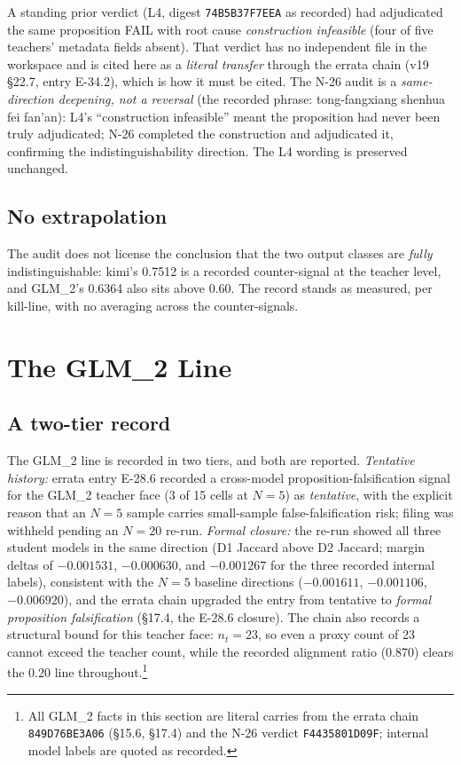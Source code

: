 \documentclass[11pt]{article}
\newcommand{\sha}[1]{\texttt{#1}}
\begin{document}
A standing prior verdict (L4, digest \sha{74B5B37F7EEA} as recorded) had adjudicated the same proposition FAIL with root cause \emph{construction infeasible} (four of five teachers' metadata fields absent). That verdict has no independent file in the workspace and is cited here as a \emph{literal transfer} through the errata chain (v19 \S22.7, entry E-34.2), which is how it must be cited. The N-26 audit is a \emph{same-direction deepening, not a reversal} (the recorded phrase: tong-fangxiang shenhua fei fan'an): L4's ``construction infeasible'' meant the proposition had never been truly adjudicated; N-26 completed the construction and adjudicated it, confirming the indistinguishability direction. The L4 wording is preserved unchanged.

\subsection{No extrapolation}

The audit does not license the conclusion that the two output classes are \emph{fully} indistinguishable: kimi's 0.7512 is a recorded counter-signal at the teacher level, and GLM\_2's 0.6364 also sits above 0.60. The record stands as measured, per kill-line, with no averaging across the counter-signals.

\section{The GLM\_2 Line}\label{sec:glm2}

\subsection{A two-tier record}

The GLM\_2 line is recorded in two tiers, and both are reported. \emph{Tentative history:} errata entry E-28.6 recorded a cross-model proposition-falsification signal for the GLM\_2 teacher face (3 of 15 cells at $N = 5$) as \emph{tentative}, with the explicit reason that an $N = 5$ sample carries small-sample false-falsification risk; filing was withheld pending an $N = 20$ re-run. \emph{Formal closure:} the re-run showed all three student models in the same direction (D1 Jaccard above D2 Jaccard; margin deltas of $-0.001531$, $-0.000630$, and $-0.001267$ for the three recorded internal labels), consistent with the $N = 5$ baseline directions ($-0.001611$, $-0.001106$, $-0.006920$), and the errata chain upgraded the entry from tentative to \emph{formal proposition falsification} (\S17.4, the E-28.6 closure). The chain also records a structural bound for this teacher face: $n_t = 23$, so even a proxy count of 23 cannot exceed the teacher count, while the recorded alignment ratio (0.870) clears the 0.20 line throughout.\footnote{All GLM\_2 facts in this section are literal carries from the errata chain \sha{849D76BE3A06} (\S15.6, \S17.4) and the N-26 verdict \sha{F4435801D09F}; internal model labels are quoted as recorded.}
\end{document}
